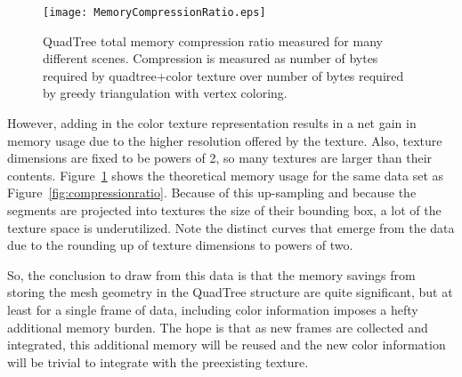 \begin{figure}[!htpb]
    \centering
    \texttt{[image: MemoryCompressionRatio.eps]}
    \caption{QuadTree total memory compression ratio measured for many different scenes. Compression is measured as number of bytes required by quadtree+color texture over number of bytes required by greedy triangulation with vertex coloring.}
    \label{fig:memorycompressionratio}
\end{figure}

However, adding in the color texture representation results in a net gain in memory usage due to the higher resolution offered by the texture. Also, texture dimensions are fixed to be powers of 2, so many textures are larger than their contents. Figure~\ref{fig:memorycompressionratio} shows the theoretical memory usage for the same data set as Figure~\ref{fig:compressionratio}. Because of this up-sampling and because the segments are projected into textures the size of their bounding box, a lot of the texture space is underutilized. Note the distinct curves that emerge from the data due to the rounding up of texture dimensions to powers of two.\par 
So, the conclusion to draw from this data is that the memory savings from storing the mesh geometry in the QuadTree structure are quite significant, but at least for a single frame of data, including color information imposes a hefty additional memory burden. The hope is that as new frames are collected and integrated, this additional memory will be reused and the new color information will be trivial to integrate with the preexisting texture.
